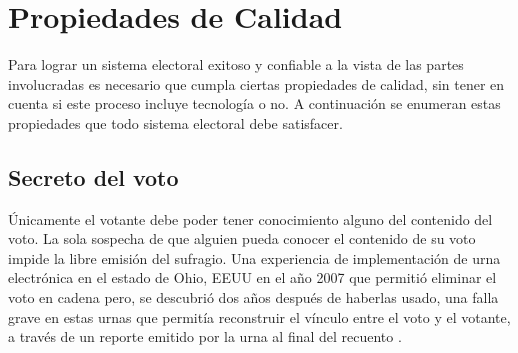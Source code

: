 \section{Propiedades de Calidad}
Para lograr un sistema electoral exitoso y confiable a la vista de las partes involucradas es necesario que cumpla ciertas propiedades de calidad, sin tener en cuenta si este proceso incluye tecnología o no. A continuación se enumeran estas propiedades que todo sistema electoral debe satisfacer.


\subsection{Secreto del voto}
Únicamente el votante debe poder tener conocimiento alguno del contenido del voto. La sola sospecha de que alguien pueda conocer el contenido de su voto impide la libre emisión del sufragio.
Una experiencia de implementación de urna electrónica en el estado de Ohio, EEUU en el año 2007 que permitió eliminar el voto en cadena pero, se descubrió dos años después de haberlas usado, una falla grave en estas urnas que permitía reconstruir el vínculo entre el voto y el votante, a través de un reporte emitido por la urna al final del recuento \cite{mcdaniel2007everest}.

